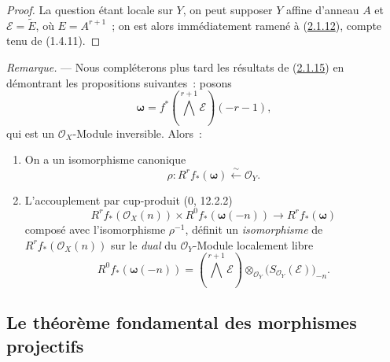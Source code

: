 \begin{proof}
La question étant locale sur $Y$, on peut supposer $Y$ affine d'anneau
$A$ et $\mathcal E=\widetilde E$, où $E=A^{r+1}$~; on est alors
immédiatement ramené à (\hyperref[III.2.1.12-fr]{2.1.12}), compte tenu de
(1.4.11).
\end{proof}

\begin{env}[2.1.16]
\label{III.2.1.16-fr}
\emph{Remarque.} --- Nous compléterons plus tard les résultats de
(\hyperref[III.2.1.15-fr]{2.1.15}) en démontrant les propositions
suivantes~: posons
\[
\boldsymbol\omega=f^*\left(\bigwedge^{r+1}\mathcal E\right)(-r-1),
\]
qui est un $\mathcal O_X$-Module inversible. Alors~:
\begin{enumerate}
\item[{\rm(i)}] On a un isomorphisme canonique
\begin{equation}
\label{III.2.1.16.1-fr}
\tag{2.1.16.1}
\rho:R^rf_*(\boldsymbol\omega)\xleftarrow{\sim}\mathcal O_Y.
\end{equation}
\item[{\rm(ii)}] L'accouplement par cup-produit (0, 12.2.2)
\begin{equation}
\label{III.2.1.16.2-fr}
\tag{2.1.16.2}
R^rf_*(\mathcal O_X(n))\times R^0f_*(\boldsymbol\omega(-n))
\longrightarrow R^rf_*(\boldsymbol\omega)
\end{equation}
composé avec l'isomorphisme $\rho^{-1}$, définit un \emph{isomorphisme}
de $R^rf_*(\mathcal O_X(n))$ sur le \emph{dual} du $\mathcal O_Y$-Module
localement libre
\[
R^0f_*(\boldsymbol\omega(-n))
=\left(\bigwedge^{r+1}\mathcal E\right)
\otimes_{\mathcal O_Y}\bigl(S_{\mathcal O_Y}(\mathcal E)\bigr)_{-n}.
\]
\end{enumerate}
\end{env}
\subsection{Le théorème fondamental des morphismes projectifs}
\label{subsection:III.2.2-fr}
